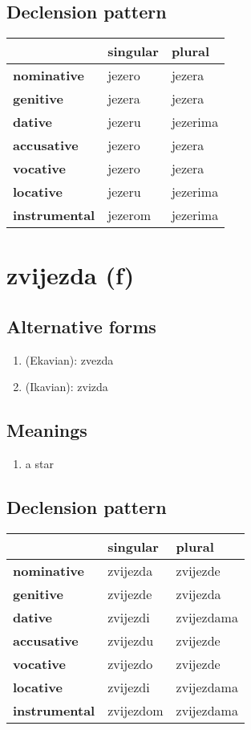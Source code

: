 \subsection*{Declension pattern}
\begin{tabularx}{\linewidth}{Xll}
\toprule
{} & singular &    plural \\
\midrule
\textbf{nominative  } &   jezero &    jezera \\
\textbf{genitive    } &   jezera &    jezera \\
\textbf{dative      } &   jezeru &  jezerima \\
\textbf{accusative  } &   jezero &    jezera \\
\textbf{vocative    } &   jezero &    jezera \\
\textbf{locative    } &   jezeru &  jezerima \\
\textbf{instrumental} &  jezerom &  jezerima \\
\bottomrule
\end{tabularx}

\filbreak
\section{zvijezda (f)}
\subsection*{Alternative forms}
\begin{enumerate}
\item (Ekavian): zvezda
\item (Ikavian): zvizda
\end{enumerate}
\subsection*{Meanings}
\begin{enumerate}
\item a star
\end{enumerate}
\subsection*{Declension pattern}
\begin{tabularx}{\linewidth}{Xll}
\toprule
{} &   singular &      plural \\
\midrule
\textbf{nominative  } &   zvijezda &    zvijezde \\
\textbf{genitive    } &   zvijezde &    zvijezda \\
\textbf{dative      } &   zvijezdi &  zvijezdama \\
\textbf{accusative  } &   zvijezdu &    zvijezde \\
\textbf{vocative    } &   zvijezdo &    zvijezde \\
\textbf{locative    } &   zvijezdi &  zvijezdama \\
\textbf{instrumental} &  zvijezdom &  zvijezdama \\
\bottomrule
\end{tabularx}

